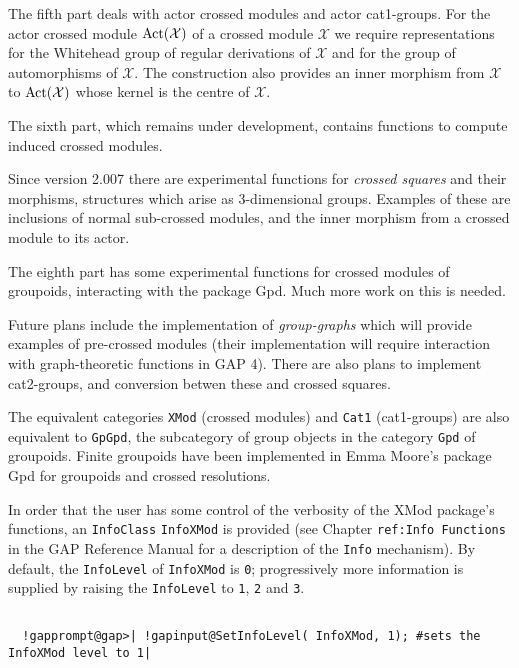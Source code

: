 \documentclass[a4paper,11pt]{report}
\begin{document}
{ The fifth part deals with actor crossed modules and actor cat1-groups. For the
actor crossed module ${\rm Act}(\mathcal{X})$ of a crossed module $\mathcal{X}$ we require representations for the Whitehead group of regular derivations of $\mathcal{X}$ and for the group of automorphisms of $\mathcal{X}$. The construction also provides an inner morphism from $\mathcal{X}$ to ${\rm Act}(\mathcal{X})$ whose kernel is the centre of $\mathcal{X}$. 

 The sixth part, which remains under development, contains functions to compute
induced crossed modules. 

 Since version 2.007 there are experimental functions for \emph{crossed squares} and their morphisms, structures which arise as $3$-dimensional groups. Examples of these are inclusions of normal sub-crossed
modules, and the inner morphism from a crossed module to its actor. 

 The eighth part has some experimental functions for crossed modules of
groupoids, interacting with the package \textsf{Gpd}. Much more work on this is needed. 

 Future plans include the implementation of \emph{group-graphs} which will provide examples of pre-crossed modules (their implementation will
require interaction with graph-theoretic functions in \textsf{GAP} 4). There are also plans to implement cat2-groups, and conversion betwen these
and crossed squares. 

 The equivalent categories \texttt{XMod} (crossed modules) and \texttt{Cat1} (cat1-groups) are also equivalent to \texttt{GpGpd}, the subcategory of group objects in the category \texttt{Gpd} of groupoids. Finite groupoids have been implemented in Emma Moore's package \textsf{Gpd} \cite{M1} for groupoids and crossed resolutions. 

  In order that the user has some control of the verbosity of the \textsf{XMod} package's functions, an \texttt{InfoClass} \texttt{InfoXMod} is provided (see Chapter \texttt{ref:Info Functions} in the \textsf{GAP} Reference Manual for a description of the \texttt{Info} mechanism). By default, the \texttt{InfoLevel} of \texttt{InfoXMod} is \texttt{0}; progressively more information is supplied by raising the \texttt{InfoLevel} to \texttt{1}, \texttt{2} and \texttt{3}. 

 
\begin{Verbatim}[commandchars=!@|,fontsize=\small,frame=single,label=Example]
  
  !gapprompt@gap>| !gapinput@SetInfoLevel( InfoXMod, 1); #sets the InfoXMod level to 1|
  

\end{Verbatim}}
\end{document}
